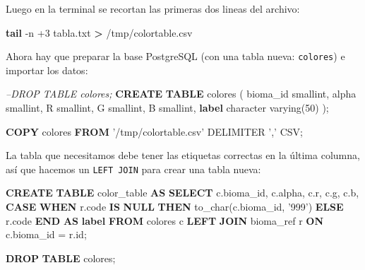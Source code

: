 \documentclass[spanish,]{article}
\newenvironment{Shaded}{}{}
\newcommand{\KeywordTok}[1]{\textcolor[rgb]{0.00,0.44,0.13}{\textbf{{#1}}}}
\newcommand{\DataTypeTok}[1]{\textcolor[rgb]{0.56,0.13,0.00}{{#1}}}
\newcommand{\DecValTok}[1]{\textcolor[rgb]{0.25,0.63,0.44}{{#1}}}
\newcommand{\StringTok}[1]{\textcolor[rgb]{0.25,0.44,0.63}{{#1}}}
\newcommand{\CommentTok}[1]{\textcolor[rgb]{0.38,0.63,0.69}{\textit{{#1}}}}
\newcommand{\FunctionTok}[1]{\textcolor[rgb]{0.02,0.16,0.49}{{#1}}}
\newcommand{\NormalTok}[1]{{#1}}
\begin{document}
Luego en la terminal se recortan las primeras dos lineas del archivo:

\begin{Shaded}
\begin{Highlighting}[]
\KeywordTok{tail} \NormalTok{-n +3 tabla.txt }\KeywordTok{>} \NormalTok{/tmp/colortable.csv}
\end{Highlighting}
\end{Shaded}

Ahora hay que preparar la base PostgreSQL (con una tabla nueva:
\texttt{colores}) e importar los datos:

\begin{Shaded}
\begin{Highlighting}[]
\CommentTok{--DROP TABLE colores;}
\KeywordTok{CREATE} \KeywordTok{TABLE} \NormalTok{colores (}
  \NormalTok{bioma_id }\DataTypeTok{smallint}\NormalTok{,}
  \NormalTok{alpha }\DataTypeTok{smallint}\NormalTok{,}
  \NormalTok{R }\DataTypeTok{smallint}\NormalTok{,}
  \NormalTok{G }\DataTypeTok{smallint}\NormalTok{,}
  \NormalTok{B }\DataTypeTok{smallint}\NormalTok{,}
  \KeywordTok{label} \DataTypeTok{character} \DataTypeTok{varying}\NormalTok{(}\DecValTok{50}\NormalTok{)}
\NormalTok{);}

\KeywordTok{COPY} \NormalTok{colores }\KeywordTok{FROM} \StringTok{'/tmp/colortable.csv'} \NormalTok{DELIMITER }\StringTok{','} \NormalTok{CSV;}
\end{Highlighting}
\end{Shaded}

La tabla que necesitamos debe tener las etiquetas correctas en la última
columna, así que hacemos un \texttt{LEFT\ JOIN} para crear una tabla
nueva:

\begin{Shaded}
\begin{Highlighting}[]
\KeywordTok{CREATE} \KeywordTok{TABLE} \NormalTok{color_table }\KeywordTok{AS}
\KeywordTok{SELECT} \NormalTok{c.bioma_id, c.alpha, c.r, c.g, c.b, }
  \KeywordTok{CASE} \KeywordTok{WHEN} \NormalTok{r.code}
    \KeywordTok{IS} \KeywordTok{NULL} \KeywordTok{THEN} \FunctionTok{to_char}\NormalTok{(c.bioma_id, }\StringTok{'999'}\NormalTok{)  }
  \KeywordTok{ELSE} \NormalTok{r.code }\KeywordTok{END} \KeywordTok{AS} \KeywordTok{label} 
  \KeywordTok{FROM} \NormalTok{colores c }\KeywordTok{LEFT} \KeywordTok{JOIN} \NormalTok{bioma_ref r }\KeywordTok{ON} \NormalTok{c.bioma_id = r.id;}

\KeywordTok{DROP} \KeywordTok{TABLE} \NormalTok{colores;}
\end{Highlighting}
\end{Shaded}
\end{document}
